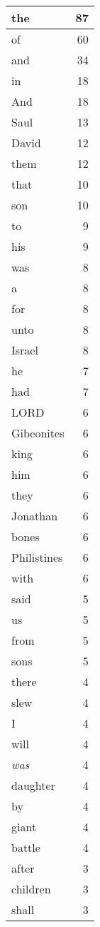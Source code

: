 \begin{center}
\begin{longtable}{l|r}
\hline \hline
\endlastfoot
the & 87 \\ \hline
of & 60 \\ \hline
and & 34 \\ \hline
in & 18 \\ \hline
And & 18 \\ \hline
Saul & 13 \\ \hline
David & 12 \\ \hline
them & 12 \\ \hline
that & 10 \\ \hline
son & 10 \\ \hline
to & 9 \\ \hline
his & 9 \\ \hline
was & 8 \\ \hline
a & 8 \\ \hline
for & 8 \\ \hline
unto & 8 \\ \hline
Israel & 8 \\ \hline
he & 7 \\ \hline
had & 7 \\ \hline
LORD & 6 \\ \hline
Gibeonites & 6 \\ \hline
king & 6 \\ \hline
him & 6 \\ \hline
they & 6 \\ \hline
Jonathan & 6 \\ \hline
bones & 6 \\ \hline
Philistines & 6 \\ \hline
with & 6 \\ \hline
said & 5 \\ \hline
us & 5 \\ \hline
from & 5 \\ \hline
sons & 5 \\ \hline
there & 4 \\ \hline
slew & 4 \\ \hline
I & 4 \\ \hline
will & 4 \\ \hline
\emph{was} & 4 \\ \hline
daughter & 4 \\ \hline
by & 4 \\ \hline
giant & 4 \\ \hline
battle & 4 \\ \hline
after & 3 \\ \hline
children & 3 \\ \hline
shall & 3 \\ \hline

\end{longtable}
\end{center}
